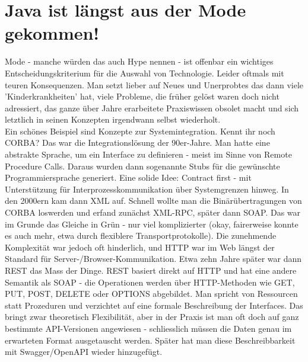 \section{Java ist längst aus der Mode gekommen!}
Mode - manche würden das auch Hype nennen - ist offenbar ein wichtiges
Entscheidungskriterium für die Auswahl von Technologie. Leider oftmals
mit teuren Konsequenzen. Man setzt lieber auf Neues und Unerprobtes das
dann viele 'Kinderkrankheiten' hat, viele Probleme, die früher gelöst waren
doch nicht adressiert, das ganze über Jahre erarbeitete Praxiswissen obsolet 
macht und sich letztlich in seinen Konzepten irgendwann selbst wiederholt.
\\
Ein schönes Beispiel sind Konzepte zur Systemintegration. Kennt ihr noch CORBA? 
Das war die Integrationslösung der 90er-Jahre. Man hatte 
eine abstrakte Sprache, um ein Interface zu definieren - meist im Sinne von 
Remote Procedure Calls. Daraus wurden dann sogenannte Stubs für die gewünschte
Programmiersprache generiert. Eine solide Idee: Contract first - mit 
Unterstützung für Interprozesskommunikation über Systemgrenzen hinweg.
In den 2000ern kam dann XML auf. Schnell wollte man die Binärübertragungen von 
CORBA loswerden und erfand zunächst XML-RPC, später dann SOAP. Das war im 
Grunde das Gleiche in Grün - nur viel komplizierter (okay, fairerweise konnte 
es auch mehr, etwa durch flexiblere Transportprotokolle). Die zunehmende 
Komplexität war jedoch oft hinderlich, und HTTP war im Web längst der 
Standard für Server-/Browser-Kommunikation.
Etwa zehn Jahre später war dann REST das Mass der Dinge. REST basiert direkt 
auf HTTP und hat eine andere Semantik als SOAP - die Operationen werden 
über HTTP-Methoden wie GET, PUT, POST, DELETE oder OPTIONS abgebildet. Man 
spricht von Ressourcen statt Prozeduren 
und verzichtet auf eine formale Beschreibung der Interfaces. Das bringt zwar 
theoretisch Flexibilität, aber in der Praxis ist man oft doch auf ganz bestimmte 
API-Versionen angewiesen - schliesslich müssen die Daten genau im
erwarteten Format ausgetauscht werden. Später hat man diese Beschreibbarkeit 
mit Swagger/OpenAPI wieder hinzugefügt.

